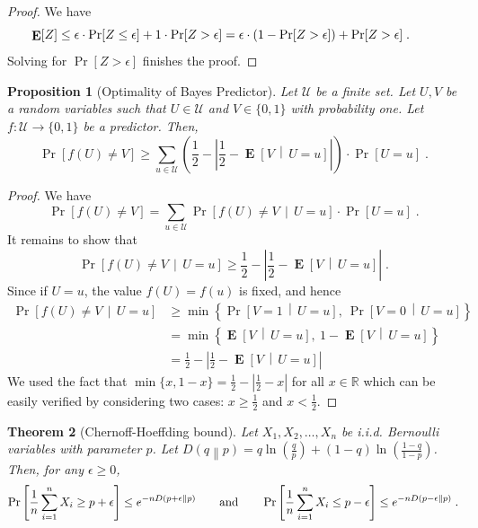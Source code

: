 \documentclass[10pt]{article}
\newtheorem{proposition}{Proposition}
\newtheorem{theorem}[proposition]{Theorem}
\newcommand{\R}{\mathbb{R}}
\newcommand{\U}{\mathcal{U}}
\newcommand{\KL}[2]{D\left(#1 \middle\| #2 \right)}
\DeclareMathOperator{\Exp}{\mathbf{E}}
\begin{document}
\begin{proof}
We have
$$
\Exp[Z]
\le \epsilon \cdot \Pr[Z \le \epsilon] + 1 \cdot \Pr[Z > \epsilon]
= \epsilon \cdot (1 - \Pr[Z > \epsilon]) + \Pr[Z > \epsilon] \; .  \qquad \qedhere
$$
Solving for $\Pr[Z > \epsilon]$ finishes the proof.
\end{proof}

\begin{proposition}[Optimality of Bayes Predictor]
\label{proposition:bayes}
Let $\mathcal{U}$ be a finite set. Let $U,V$ be a random variables such that $U \in \U$ and $V \in \{0,1\}$ with probability one.
Let $f:\mathcal{U} \to \{0,1\}$ be a predictor. Then,
$$
\Pr\left[ f(U) \neq V \right]
\ge \sum_{u \in \U} \left( \frac{1}{2} - \left| \frac{1}{2} -  \Exp \left[V \, \middle| \, U = u\right] \right| \right) \cdot \Pr[U = u] \; .
$$
\end{proposition}

\begin{proof}
We have
$$
\Pr \left[ f(U) \neq V \right] = \sum_{u \in \U} \Pr \left[ f(U) \neq V \, \middle| \, U = u \right] \cdot \Pr[U = u] \; .
$$
It remains to show that
$$
\Pr\left[ f(U) \neq V \, \middle| \, U = u \right]
\ge
\frac{1}{2} - \left| \frac{1}{2} -  \Exp \left[V \, \middle| \, U = u \right] \right| \; .
$$
Since if  $U=u$, the value $f(U) = f(u)$ is fixed, and hence
\begin{align*}
\Pr\left[ f(U) \neq V \, \middle| \, U = u \right]
& \ge \min\left\{ \Pr \left[ V = 1 \, \middle| \, U = u \right], \ \Pr \left[ V = 0 \, \middle| \, U = u \right] \right\} \\
& = \min\left\{ \Exp \left[ V  \, \middle| \, U = u \right], \ 1 - \Exp \left[ V \, \middle| \, U = u \right] \right\} \\
& = \frac{1}{2} - \left| \frac{1}{2} -  \Exp \left[ V  \, \middle| \, U = u \right] \right|
\end{align*}
We used the fact that $\min\{x, 1 - x\} = \frac{1}{2} - \left| \frac{1}{2} - x \right|$ for all $x \in \R$
which can be easily verified by considering two cases: $x \ge \frac{1}{2}$ and $x < \frac{1}{2}$.
\end{proof}

\begin{theorem}[Chernoff-Hoeffding bound]
Let $X_1, X_2, \dots, X_n$ be i.i.d. Bernoulli variables with parameter $p$.
Let $\KL{q}{p} = q \ln \left( \frac{q}{p} \right) + (1 - q) \ln\left( \frac{1-q}{1-p} \right)$.
Then, for any $\epsilon \ge 0$,
$$
\Pr \left[{\frac {1}{n}} \sum_{i=1}^n X_i \ge p + \epsilon \right] \le e^{ - n \KL{p + \epsilon}{p}}  \qquad \text{and} \qquad
\Pr \left[{\frac {1}{n}} \sum_{i=1}^n X_i \le p - \epsilon \right] \le e^{ - n \KL{p - \epsilon}{p}}  \; . \\
$$
\end{theorem}
\end{document}
